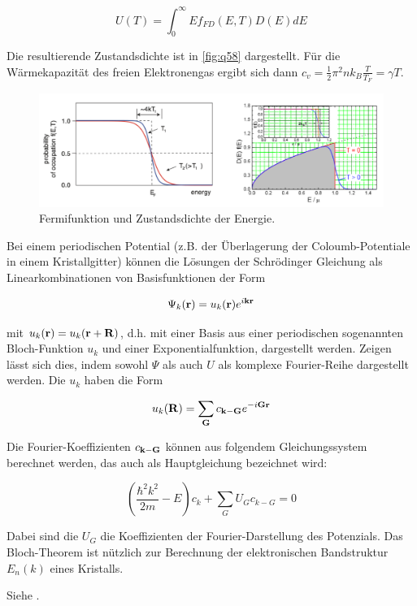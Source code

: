 \[ U(T) = \displaystyle \int_0^\infty E f_{FD}(E,T) D(E) dE \]

Die resultierende Zustandsdichte ist in \autoref{fig:q58} dargestellt. Für die Wärmekapazität des freien Elektronengas ergibt sich dann \( c_v = \frac{1}{2} \pi^2 nk_B \frac{T}{T_F} = \gamma T\). 

\begin{figure}[H]
    \centering
    \includegraphics[width=\textwidth]{resources/24-03-2015/D(E)f(E).png}
    \caption{Fermifunktion und Zustandsdichte der Energie.}
    \label{fig:q58}
\end{figure}

\label{q:59}

Bei einem periodischen Potential (z.B. der Überlagerung der Coloumb-Potentiale in einem Kristallgitter) können die Lösungen der Schrödinger Gleichung als Linearkombinationen von Basisfunktionen der Form

\[ \Psi_k(\vb{r}) = u_k(\vb{r}) e^{i\vb{k}\vb{r}}\]

mit \( u_k(\vb{r}) = u_k(\vb{r} + \vb{R}) \), d.h. mit einer Basis aus einer periodischen sogenannten Bloch-Funktion $u_k$ und einer Exponentialfunktion, dargestellt werden. Zeigen lässt sich dies, indem sowohl $\Psi$ als auch $U$ als komplexe Fourier-Reihe dargestellt werden. Die $u_k$ haben die Form

\[ u_k(\vb{R}) = \displaystyle \sum_{\vb{G}} c_{\vb{k}-\vb{G}}  e^{-i \vb{G} \vb{r}} \]

Die Fourier-Koeffizienten $c_{\vb{k}-\vb{G}}$ können aus folgendem Gleichungssystem berechnet werden, das auch als Hauptgleichung bezeichnet wird:

\[ \left( \frac{\hbar^2 k^2}{2m} - E \right) c_k + \displaystyle \sum_G U_G c_{k-G} = 0 \]

Dabei sind die $U_G$ die Koeffizienten der Fourier-Darstellung des Potenzials. Das Bloch-Theorem ist nützlich zur Berechnung der elektronischen Bandstruktur $E_n(k)$ eines Kristalls. 

\label{q:60}

Siehe .

\newpage